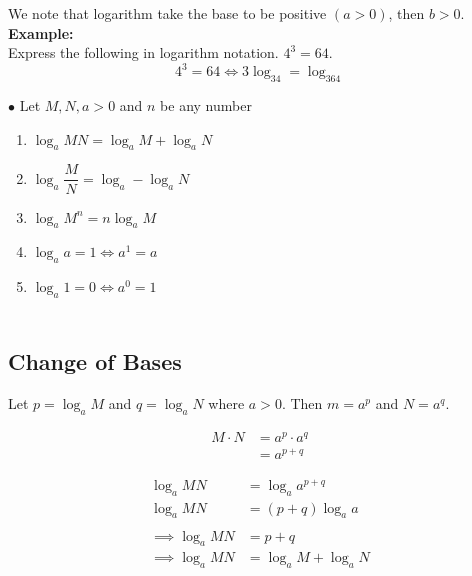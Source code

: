 \documentclass[11pt,a4paper]{article}
\begin{document}
We note that logarithm take the base to be positive $(a>0)$, then $b>0$.\\


\textbf{Example:}\\
Express the following in logarithm notation. $4^3=64$.\\
$$4^3=64\iff 3\log_34=\log_364$$


$\bullet$ Let $M,N, a>0$ and $n$ be any number
\begin{enumerate}
\item $\log_{\displaystyle{a}}MN =\log_{\displaystyle{a}}M+\log_{\displaystyle{a}}N$
\item $\log_{\displaystyle{a}}\dfrac{M}{N}=\log_{\displaystyle{a}}-\log_{\displaystyle{a}}N$
\item $\log_{\displaystyle{a}}M^{\displaystyle{n}} = n\log_{\displaystyle{a}}M$
\item $\log_{\displaystyle{a}}a=1\iff a^1=a$
\item $\log_{\displaystyle{a}}1=0 \iff a^{0}=1$\\\\
\end{enumerate}









\subsection{Change of Bases}
Let $p=\log_{\displaystyle{a}}M$ and $q=\log_{\displaystyle{a}}N$ where $a>0$. Then $m=a^{\displaystyle{p}}$ and $N=a^{\displaystyle{q}}$.


\begin{align*}
M\cdot N & = a^{\displaystyle{p}}\cdot a^{\displaystyle{q}}\\ 
         & = a^{\displaystyle{p+q}}
\end{align*}



\begin{align*}
\log_{\displaystyle{a}}MN & = \log_{\displaystyle{a}}a^{\displaystyle{p+q}}\\
\log_{\displaystyle{a}}MN & =(p+q) \log_{\displaystyle{a}}a\\\\
\implies \log_{\displaystyle{a}}MN & = p+q\\
\implies \log_{\displaystyle{a}}MN & = \log_{\displaystyle{a}}M+\log_{\displaystyle{a}}N
\end{align*}
\end{document}
